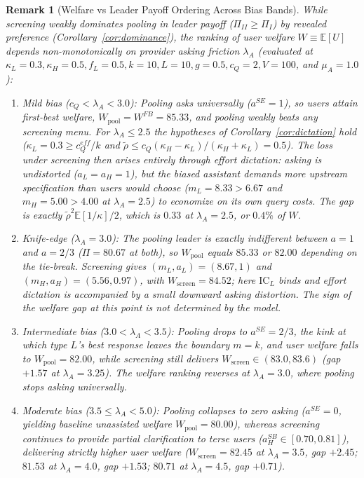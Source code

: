 \documentclass[11pt]{article}
\newtheorem{remark}{Remark}
\begin{document}
\begin{remark}[Welfare vs Leader Payoff Ordering Across Bias Bands]
\label{rmk:welfare-ordering}
While screening weakly dominates pooling in leader payoff ($\Pi_{II} \ge \Pi_I$) by revealed preference (Corollary~\ref{cor:dominance}), the ranking of user welfare $W \equiv \mathbb{E}[U]$ depends non-monotonically on provider asking friction $\lambda_A$ (evaluated at $\kappa_L=0.3, \kappa_H=0.5, f_L=0.5, k=10, L=10, g=0.5, c_Q=2, V=100$, and $\mu_A=1.0$):
\begin{enumerate}[leftmargin=*]
\item \emph{Mild bias ($c_Q < \lambda_A < 3.0$):} Pooling asks universally ($a^{SE} = 1$), so users attain first-best welfare, $W_{\text{pool}} = W^{FB} = 85.33$, and pooling weakly beats any screening menu. For $\lambda_A \le 2.5$ the hypotheses of Corollary~\ref{cor:dictation} hold ($\kappa_L = 0.3 \ge c_Q^{eff}/k$ and $\tilde\rho \le c_Q(\kappa_H - \kappa_L)/(\kappa_H + \kappa_L) = 0.5$). The loss under screening then arises entirely through \emph{effort dictation}: asking is undistorted ($a_L = a_H = 1$), but the biased assistant demands more upstream specification than users would choose ($m_L = 8.33 > 6.67$ and $m_H = 5.00 > 4.00$ at $\lambda_A = 2.5$) to economize on its own query costs. The gap is exactly $\tilde\rho^2\mathbb{E}[1/\kappa]/2$, which is $0.33$ at $\lambda_A = 2.5$, or $0.4\%$ of $W$.
\item \emph{Knife-edge ($\lambda_A = 3.0$):} The pooling leader is exactly indifferent between $a = 1$ and $a = 2/3$ ($\Pi = 80.67$ at both), so $W_{\text{pool}}$ equals $85.33$ or $82.00$ depending on the tie-break. Screening gives $(m_L, a_L) = (8.67, 1)$ and $(m_H, a_H) = (5.56, 0.97)$, with $W_{\text{screen}} = 84.52$; here $\text{IC}_L$ binds and effort dictation is accompanied by a small downward asking distortion. The sign of the welfare gap at this point is not determined by the model.
\item \emph{Intermediate bias ($3.0 < \lambda_A < 3.5$):} Pooling drops to $a^{SE} = 2/3$, the kink at which type $L$'s best response leaves the boundary $m = k$, and user welfare falls to $W_{\text{pool}} = 82.00$, while screening still delivers $W_{\text{screen}} \in (83.0, 83.6)$ (gap $+1.57$ at $\lambda_A = 3.25$). The welfare ranking reverses at $\lambda_A = 3.0$, where pooling stops asking universally.
\item \emph{Moderate bias ($3.5 \le \lambda_A < 5.0$):} Pooling collapses to zero asking ($a^{SE} = 0$, yielding baseline unassisted welfare $W_{\text{pool}} = 80.00$), whereas screening continues to provide partial clarification to terse users ($a_H^{SB} \in [0.70, 0.81]$), delivering strictly higher user welfare ($W_{\text{screen}} = 82.45$ at $\lambda_A = 3.5$, gap $+2.45$; $81.53$ at $\lambda_A = 4.0$, gap $+1.53$; $80.71$ at $\lambda_A = 4.5$, gap $+0.71$).

\end{enumerate}
\end{remark}
\end{document}
